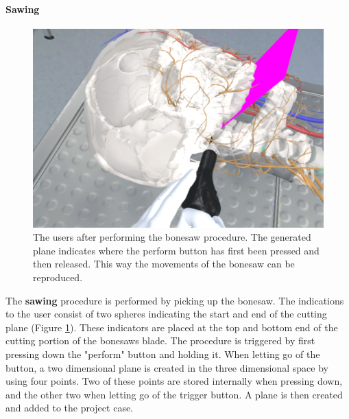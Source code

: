 \paragraph{Sawing}

\begin{figure}[ht]
    \centering
    \includegraphics[width=\linewidth]{images/implementation/features/procedures/bonesaw_1.png}
    \caption{\label{fig::FeatureBoneSaw}The users after performing the bonesaw procedure. The generated plane indicates where the perform button has first been pressed and then released. This way the movements of the bonesaw can be reproduced.}
\end{figure}

The \textbf{sawing} procedure is performed by picking up the bonesaw.
The indications to the user consist of two spheres indicating the start and end of the cutting plane (Figure \ref{fig::FeatureBoneSaw}).
These indicators are placed at the top and bottom end of the cutting portion of the bonesaws blade.
The procedure is triggered by first pressing down the "perform" button and holding it.
When letting go of the button, a two dimensional plane is created in the three dimensional space by using four points.
Two of these points are stored internally when pressing down, and the other two when letting go of the trigger button.
A plane is then created and added to the project case.

